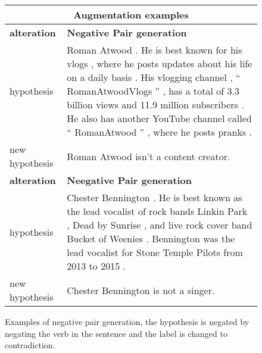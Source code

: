 \documentclass[11pt,a4paper]{article}
\begin{document}
    \begin{figure*}[t]
        \centering
        \begin{adjustbox}{width=\textwidth}
        \begin{tabular}{|p{}|p{}|}
        \hline
        \multicolumn{2}{|c|}{\textbf{Augmentation examples}} \\
        \hline
        \textbf{alteration} & \textbf{Negative Pair generation} \\
        hypothesis & 	Roman Atwood . He is best known for his vlogs , where he posts updates about his life on a daily basis . His vlogging channel , `` RomanAtwoodVlogs '' , has a total of 3.3 billion views and 11.9 million subscribers . He also has another YouTube channel called `` RomanAtwood '' , where he posts pranks . \\
        new hypothesis & Roman Atwood isn't a content creator. \\ 
        \hline
        \textbf{alteration} & \textbf{Neegative Pair generation} \\
        hypothesis & Chester Bennington . He is best known as the lead vocalist of rock bands Linkin Park , Dead by Sunrise , and live rock cover band Bucket of Weenies . Bennington was the lead vocalist for Stone Temple Pilots from 2013 to 2015 . \\
        new hypothesis & Chester Bennington is not a singer. \\
        \hline
        \end{tabular}
        \end{adjustbox}
        \caption{Examples of negative pair generation, the hypothesis is negated by negating the verb in the sentence and the label is changed to contradiction.}
        \label{fig:alteration-examples}
        \end{figure*}
\end{document}
